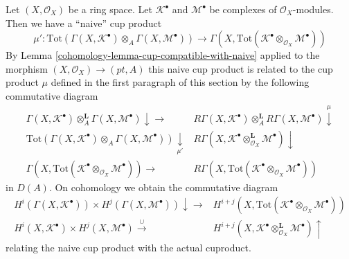 Let $(X, \mathcal{O}_X)$ be a ring space. Let $\mathcal{K}^\bullet$ and
$\mathcal{M}^\bullet$ be complexes of $\mathcal{O}_X$-modules.
Then we have a ``naive'' cup product
$$
\mu' :
\text{Tot}(
\Gamma(X, \mathcal{K}^\bullet) \otimes_A \Gamma(X, \mathcal{M}^\bullet))
\longrightarrow
\Gamma(X, \text{Tot}(
\mathcal{K}^\bullet \otimes_{\mathcal{O}_X} \mathcal{M}^\bullet))
$$
By Lemma \ref{cohomology-lemma-cup-compatible-with-naive}
applied to the morphism $(X, \mathcal{O}_X) \to (pt, A)$
this naive cup product is related to the cup product $\mu$
defined in the first paragraph of this section by the
following commutative diagram
$$
\begin{array}{cc}\Gamma(X, \mathcal{K}^\bullet)
\otimes_A^\mathbf{L}
\Gamma(X, \mathcal{M}^\bullet) \downarrow\longrightarrow & R\Gamma(X, \mathcal{K}^\bullet)
\otimes_A^\mathbf{L}
R\Gamma(X, \mathcal{M}^\bullet) \overset{\mu}{\downarrow} \\ \text{Tot}(\Gamma(X, \mathcal{K}^\bullet)
\otimes_A
\Gamma(X, \mathcal{M}^\bullet)) \underset{\mu'}{\downarrow} & R\Gamma(X, \mathcal{K}^\bullet
\otimes_{\mathcal{O}_X}^\mathbf{L}
\mathcal{M}^\bullet) \downarrow \\ \Gamma(X, \text{Tot}(\mathcal{K}^\bullet
\otimes_{\mathcal{O}_X}
\mathcal{M}^\bullet)) \longrightarrow & R\Gamma(X, \text{Tot}(\mathcal{K}^\bullet
\otimes_{\mathcal{O}_X}
\mathcal{M}^\bullet))\end{array}
$$
in $D(A)$. On cohomology we obtain the commutative diagram
$$
\begin{array}{cc}H^i(\Gamma(X, \mathcal{K}^\bullet)) \times
H^j(\Gamma(X, \mathcal{M}^\bullet)) \downarrow\longrightarrow & H^{i + j}(X,
\text{Tot}(\mathcal{K}^\bullet \otimes_{\mathcal{O}_X} \mathcal{M}^\bullet)) \\ H^i(X, \mathcal{K}^\bullet) \times
H^j(X, \mathcal{M}^\bullet) \overset{\cup}{\longrightarrow} & H^{i + j}(X, \mathcal{K}^\bullet \otimes_{\mathcal{O}_X}^\mathbf{L}
\mathcal{M}^\bullet) \uparrow\end{array}
$$
relating the naive cup product with the actual cuproduct.

